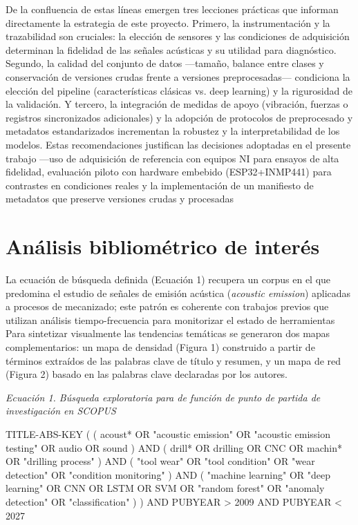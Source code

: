 \documentclass[12pt, letterpaper]{report}
\begin{document}
De la confluencia de estas líneas emergen tres lecciones prácticas que informan directamente la estrategia de este proyecto. Primero, la instrumentación y la trazabilidad son cruciales: la elección de sensores y las condiciones de adquisición determinan la fidelidad de las señales acústicas y su utilidad para diagnóstico. Segundo, la calidad del conjunto de datos ---tamaño, balance entre clases y conservación de versiones crudas frente a versiones preprocesadas--- condiciona la elección del pipeline (características clásicas vs. deep learning) y la rigurosidad de la validación. Y tercero, la integración de medidas de apoyo (vibración, fuerzas o registros sincronizados adicionales) y la adopción de protocolos de preprocesado y metadatos estandarizados incrementan la robustez y la interpretabilidad de los modelos. Estas recomendaciones justifican las decisiones adoptadas en el presente trabajo ---uso de adquisición de referencia con equipos NI para ensayos de alta fidelidad, evaluación piloto con hardware embebido (ESP32+INMP441) para contrastes en condiciones reales y la implementación de un manifiesto de metadatos que preserve versiones crudas y procesadas

\section{Análisis bibliométrico de interés}

La ecuación de búsqueda definida (Ecuación 1) recupera un corpus en el que predomina el estudio de señales de emisión acústica (\textit{acoustic emission}) aplicadas a procesos de mecanizado; este patrón es coherente con trabajos previos que utilizan análisis tiempo-frecuencia para monitorizar el estado de herramientas  Para sintetizar visualmente las tendencias temáticas se generaron dos mapas complementarios: un mapa de densidad (Figura 1) construido a partir de términos extraídos de las palabras clave de título y resumen, y un mapa de red (Figura 2) basado en las palabras clave declaradas por los autores.

{\small\textit{Ecuación 1. Búsqueda exploratoria para de función de punto de partida de investigación en SCOPUS}}

TITLE-ABS-KEY ( ( acoust* OR "acoustic emission" OR "acoustic emission testing" OR audio OR sound ) AND ( drill* OR drilling OR CNC OR machin* OR "drilling process" ) AND ( "tool wear" OR "tool condition" OR "wear detection" OR "condition monitoring" ) AND ( "machine learning" OR "deep learning" OR CNN OR LSTM OR SVM OR "random forest" OR "anomaly detection" OR "classification" ) ) AND PUBYEAR > 2009 AND PUBYEAR < 2027
\end{document}
